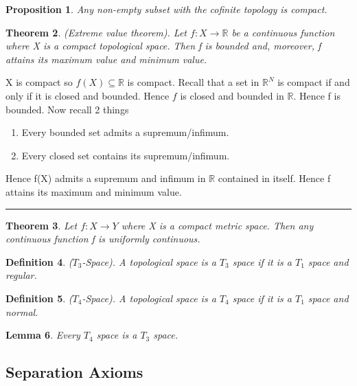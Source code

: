 \documentclass[twoside]{article}
\newcounter{lecnum}
\newtheorem{theorem}{Theorem}[lecnum]
\newtheorem{lemma}[theorem]{Lemma}
\newtheorem{proposition}[theorem]{Proposition}
\newtheorem{definition}[theorem]{Definition}
\newenvironment{proof}{{\bf Proof:}}{\hfill\rule{2mm}{2mm}}
\begin{document}
\begin{proposition}Any non-empty subset with the cofinite topology is compact.
\end{proposition}

\begin{theorem}(Extreme value theorem). Let $f:X \rightarrow \mathbb{R}$ be a continuous function where X is a compact topological space. Then f is bounded and, moreover, f attains its maximum value and minimum value.
\end{theorem}

\begin{proof}X is compact so $f(X) \subseteq \mathbb{R}$ is compact. Recall that a set in $\mathbb{R}^N$ is compact if and only if it is closed and bounded. Hence $f$ is closed and bounded in $\mathbb{R}$. Hence f is bounded.
\newline
Now recall 2 things
\begin{enumerate}
\item Every bounded set admits a supremum/infimum.
\item Every closed set contains its supremum/infimum.
\end{enumerate}
Hence f(X) admits a supremum and infimum in $\mathbb{R}$ contained in itself. Hence f attains its maximum and minimum value.
\end{proof}

\begin{theorem}Let $f:X \rightarrow Y$ where X is a compact metric space. Then any continuous function f is uniformly continuous.
\end{theorem}

\begin{definition}($T_3$-Space). A topological space is a $T_3$ space if it is a $T_1$ space and regular.
\end{definition}

\begin{definition}($T_4$-Space). A topological space is a $T_4$ space if it is a $T_1$ space and normal.
\end{definition}

\begin{lemma}Every $T_4$ space is a $T_3$ space.
\end{lemma}

\subsection{Separation Axioms}
\end{document}
